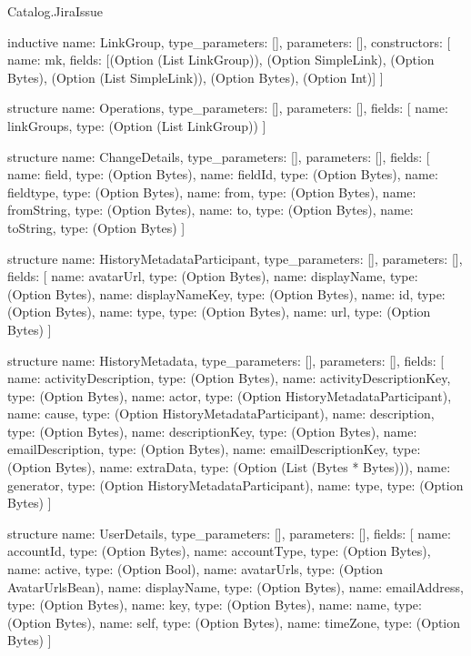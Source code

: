 \begin{lexlean}{Catalog.JiraIssue}
\begin{semanticmodule}
inductive{
  name: LinkGroup,
  type_parameters: [],
  parameters: [],
  constructors: [
    {name: mk, fields: [(Option (List LinkGroup)), (Option SimpleLink), (Option Bytes), (Option (List SimpleLink)), (Option Bytes), (Option Int)]}
  ]
}

structure{
  name: Operations,
  type_parameters: [],
  parameters: [],
  fields: [
    {name: linkGroups, type: (Option (List LinkGroup))}
  ]
}

structure{
  name: ChangeDetails,
  type_parameters: [],
  parameters: [],
  fields: [
    {name: field, type: (Option Bytes)},
    {name: fieldId, type: (Option Bytes)},
    {name: fieldtype, type: (Option Bytes)},
    {name: from, type: (Option Bytes)},
    {name: fromString, type: (Option Bytes)},
    {name: to, type: (Option Bytes)},
    {name: toString, type: (Option Bytes)}
  ]
}

structure{
  name: HistoryMetadataParticipant,
  type_parameters: [],
  parameters: [],
  fields: [
    {name: avatarUrl, type: (Option Bytes)},
    {name: displayName, type: (Option Bytes)},
    {name: displayNameKey, type: (Option Bytes)},
    {name: id, type: (Option Bytes)},
    {name: type, type: (Option Bytes)},
    {name: url, type: (Option Bytes)}
  ]
}

structure{
  name: HistoryMetadata,
  type_parameters: [],
  parameters: [],
  fields: [
    {name: activityDescription, type: (Option Bytes)},
    {name: activityDescriptionKey, type: (Option Bytes)},
    {name: actor, type: (Option HistoryMetadataParticipant)},
    {name: cause, type: (Option HistoryMetadataParticipant)},
    {name: description, type: (Option Bytes)},
    {name: descriptionKey, type: (Option Bytes)},
    {name: emailDescription, type: (Option Bytes)},
    {name: emailDescriptionKey, type: (Option Bytes)},
    {name: extraData, type: (Option (List (Bytes * Bytes)))},
    {name: generator, type: (Option HistoryMetadataParticipant)},
    {name: type, type: (Option Bytes)}
  ]
}

structure{
  name: UserDetails,
  type_parameters: [],
  parameters: [],
  fields: [
    {name: accountId, type: (Option Bytes)},
    {name: accountType, type: (Option Bytes)},
    {name: active, type: (Option Bool)},
    {name: avatarUrls, type: (Option AvatarUrlsBean)},
    {name: displayName, type: (Option Bytes)},
    {name: emailAddress, type: (Option Bytes)},
    {name: key, type: (Option Bytes)},
    {name: name, type: (Option Bytes)},
    {name: self, type: (Option Bytes)},
    {name: timeZone, type: (Option Bytes)}
  ]
}


\end{semanticmodule}
\end{lexlean}
